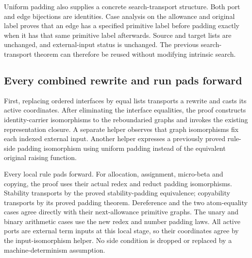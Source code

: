 
Uniform padding also supplies a concrete search-transport structure.
Both port and edge bijections are identities. Case analysis on the allowance
and original label proves that an edge has a specified primitive label before
padding exactly when it has that same primitive label afterwards. Source and
target lists are unchanged, and external-input status is unchanged. The
previous search-transport theorem can therefore be reused without modifying
intrinsic search.


\subsection{Every combined rewrite and run pads forward}

First, replacing ordered interfaces by equal lists transports a rewrite
and casts its active coordinates. After eliminating the interface equalities,
the proof constructs identity-carrier isomorphisms to the reboundaried graphs
and invokes the existing representation closure. A separate helper observes
that graph isomorphisms fix each indexed external input. Another helper
expresses a previously proved rule-side padding isomorphism using uniform
padding instead of the equivalent original raising function.




Every local rule pads forward. For allocation, assignment, micro-beta
and copying, the proof uses their actual redex and reduct padding
isomorphisms. Stability transports by the proved stability-padding equivalence;
copyability transports by its proved padding theorem. Dereference and the two
atom-equality cases agree directly with their next-allowance primitive graphs.
The unary and binary arithmetic cases use the new redex and number padding
laws. All active ports are external term inputs at this local stage, so their
coordinates agree by the input-isomorphism helper. No side condition is
dropped or replaced by a machine-determinism assumption.


